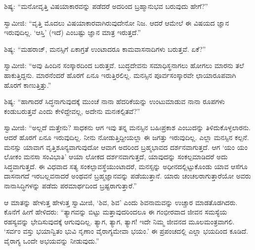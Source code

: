  ಶಿಷ್ಯ: “ಮನೋವೃತ್ತಿ ವಿಷಯಾಕಾರವನ್ನು ಪಡೆದರೆ ಅದರಿಂದ ಬ್ರಹ್ಮಾನುಭವ ಬರುವುದು ಹೇಗೆ?” 

 ಸ್ವಾಮೀಜಿ: “ವೃತ್ತಿ ಮೊದಲು ವಿಷಯಾಕಾರವಾಗಿರುವುದೇನೋ ನಿಜ. ಆದರೆ ಆಮೇಲೆ ಈ ವಿಷಯದ ಜ್ಞಾನ ಇರುವುದಿಲ್ಲ. ‘ಆಸ್ತಿ’ (ಇದೆ) ಎಂಬಷ್ಟು ಜ್ಞಾನ ಮಾತ್ರ ಇರುತ್ತದೆ.” 

 ಶಿಷ್ಯ: “ಮಹರಾಜ್, ಮನಸ್ಸಿಗೆ ಏಕಾಗ್ರತೆ ಉಂಟಾದರೂ ಕಾಮವಾಸನಾದಿಗಳು ಬರುತ್ತವೆ. ಏಕೆ?” 

 ಸ್ವಾಮೀಜಿ: “ಅವು ಹಿಂದಿನ ಸಂಸ್ಕಾರದಿಂದ ಬರುತ್ತವೆ. ಬುದ್ಧದೇವನು ಸಮಾಧಿಸ್ಥನಾಗಲು ಹೋಗಲು ಮಾರನು ತಲೆ ಹಾಕುತ್ತಿದ್ದನು. ಮಾರನೆಂದರೆ ಹೊರಗೆ ಏನೂ ಇರುತ್ತಿರಲಿಲ್ಲ. ಮನಸ್ಸಿನ ಪೂರ್ವಸಂಸ್ಕಾರವೇ ಛಾಯಾರೂಪವಾಗಿ ಹೊರಗೆ ಕಾಣುತ್ತಿತ್ತು.” 

 ಶಿಷ್ಯ: “ಹಾಗಾದರೆ ಸಿದ್ಧನಾಗುವುದಕ್ಕೆ ಮುಂಚೆ ನಾನಾ ಹೆದರಿಕೆಯನ್ನು ಉಂಟುಮಾಡುವ ನಾನಾ ರೂಪಗಳು ಕಂಡುಬರುತ್ತವೆ ಎಂದು ಕೇಳಿದ್ದೇವಲ್ಲ, ಅದೇನು ಮನಃಕಲ್ಪಿತವೆ?” 

 ಸ್ವಾಮೀಜಿ: “ಅಲ್ಲದೆ ಮತ್ತೇನು? ಸಾಧಕನು ಆಗ ಇವು ತನ್ನ ಮನಸ್ಸಿನ ಬಹಿಃಪ್ರಕಾಶ ಎಂಬುದನ್ನು ತಿಳಿದುಕೊಳ್ಳಲಾರನು. ಆದರೆ ಹೊರಗೆ ಏನೂ ಇರುವುದಿಲ್ಲ. ನೀನು ನೋಡುತ್ತಿದ್ದೀಯಲ್ಲಾ ಈ ಜಗತ್ತು ಇರುವುದಿಲ್ಲ. ಎಲ್ಲಾ ಮನಸ್ಸಿನ ಕಲ್ಪನೆ. ಮನಸ್ಸು ಯಾವಾಗ ವೃತ್ತಿಶೂನ್ಯವಾಗುವುದೋ ಆವಾಗ ಅದರಿಂದ ಬ್ರಹ್ಮಭಾವದ ದರ್ಶನವಾಗುತ್ತದೆ. ಆಗ ‘ಯಂ ಯಂ ಲೋಕಂ ಮನಸಾ ಸಂವಿಭಾತಿ’ ಆಯಾ ಲೋಕದ ದರ್ಶನವಾಗುತ್ತದೆ, ಯಾವುದನ್ನು ಸಂಕಲ್ಪಮಾಡಿದರೆ ಅದು ಸಿದ್ಧವಾಗುತ್ತದೆ. ಈ ವಿಧವಾದ ಸತ್ಯ ಸಂಕಲ್ಪಾವಸ್ಥೆಯುಂಟಾದರೆ, ಮನಸ್ಸನ್ನು ಅಧೀನದಲ್ಲಿಟ್ಟುಕೊಂಡು ಯಾವ ಆಸೆಗೂ ದಾಸನಾಗದೆ ಇರಬಲ್ಲವನಾದರೆ ಅಂಥವನೆ ಬ್ರಹ್ಮಜ್ಞಾನವನ್ನು ಪಡೆಯುತ್ತಾನೆ. ಯಾರು ಚಂಚಲರಾಗುತ್ತಾರೆಯೋ ಅವರು ನಾನಾಸಿದ್ಧಿಗಳನ್ನು ಪಡೆದು ಪರಮಾರ್ಥದಿಂದ ಬ್ರಷ್ಟರಾಗುತ್ತಾರೆ.” 

 ಆ ಮಾತನ್ನು ಹೇಳುತ್ತ ಹೇಳುತ್ತ ಸ್ವಾಮೀಜಿ, ‘ಶಿವ, ಶಿವ’ ಎಂದು ಶಿವನಾಮವನ್ನು ಉಚ್ಚಾರ ಮಾಡತೊಡಗಿದರು. ಕೊನೆಗೆ ಹೀಗೆ ಹೇಳಿದರು: “ತ್ಯಾಗವನ್ನು ಬಿಟ್ಟು ಮತ್ತಾವುದರಿಂದಲೂ ಈ ಗಂಭೀರವಾದ ಜೀವನ ಸಮಸ್ಯೆಯ ರಹಸ್ಯವನ್ನು ಭೇದಿಸುವುದಕ್ಕೆ ಆಗುವುದಿಲ್ಲ. ತ್ಯಾಗ, ತ್ಯಾಗ, ತ್ಯಾಗ! ಇದೇ ನಿಮ್ಮ ಜೀವನದ ಮೂಲಮಂತ್ರವಾಗಲಿ. ‘ಸರ್ವಂ ವಸ್ತು ಭಯಾನ್ವಿತಂ ಭುವಿ ನೃಣಾಂ ವೈರಾಗ್ಯಮೇವಾ ಭಯಂ.’ ಈ ಪ್ರಪಂಚದಲ್ಲಿ ಎಲ್ಲಾ ಭಯದಿಂದ ಕೂಡಿದೆ. ವೈರಾಗ್ಯ ಒಂದೇ ಅಭಯವನ್ನು ನೀಡುವುದು.” 

